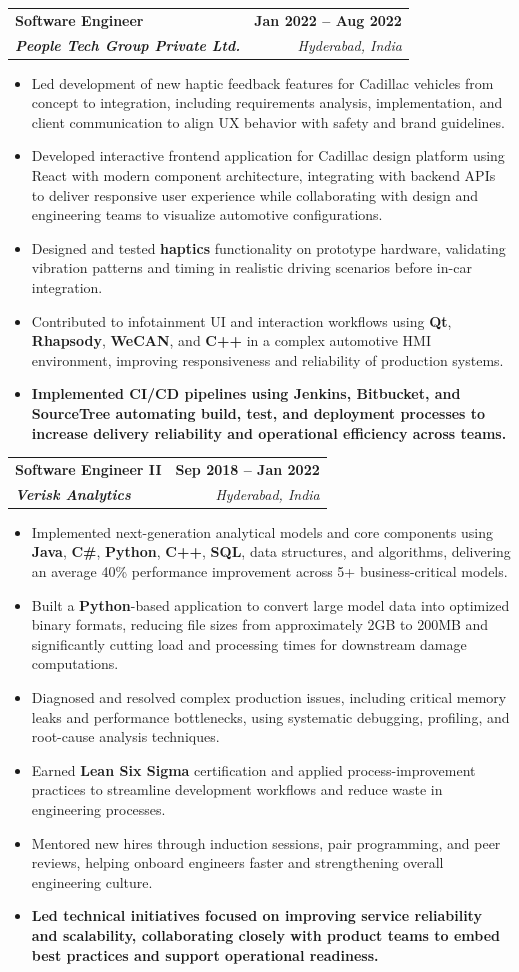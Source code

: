 \documentclass[letterpaper,11pt]{article}
\makeatletter
\newcommand{\resumeItem}[1]{
  \item\small{
    {#1 \vspace{-2pt}}
  }
}
\newcommand{\resumeSubheading}[4]{
  \vspace{-2pt}\item
    \begin{tabular*}{1.0\textwidth}[t]{l@{\extracolsep{\fill}}r}
      \textbf{#1} & \textbf{\small #2} \\
      \textit{\small#3} & \textit{\small #4} \\
    \end{tabular*}\vspace{-7pt}
}
\newcommand{\resumeItemListStart}{\begin{itemize}}
\newcommand{\resumeItemListEnd}{\end{itemize}\vspace{-5pt}}
\makeatother
\begin{document}
    \resumeSubheading
      {\textbf{Software Engineer}}{\textbf{Jan 2022 -- Aug 2022}}
      {\textbf{People Tech Group Private Ltd.}}{Hyderabad, India}
      \resumeItemListStart
        \resumeItem{Led development of new haptic feedback features for Cadillac vehicles from concept to integration, including requirements analysis, implementation, and client communication to align UX behavior with safety and brand guidelines.}
        \resumeItem{Developed interactive frontend application for Cadillac design platform using React with modern component architecture, integrating with backend APIs to deliver responsive user experience while collaborating with design and engineering teams to visualize automotive configurations.}
        \resumeItem{Designed and tested \textbf{haptics} functionality on prototype hardware, validating vibration patterns and timing in realistic driving scenarios before in-car integration.}
        \resumeItem{Contributed to infotainment UI and interaction workflows using \textbf{Qt}, \textbf{Rhapsody}, \textbf{WeCAN}, and \textbf{C++} in a complex automotive HMI environment, improving responsiveness and reliability of production systems.}
        \resumeItem{\textbf{Implemented CI/CD pipelines using Jenkins, Bitbucket, and SourceTree automating build, test, and deployment processes to increase delivery reliability and operational efficiency across teams.}}
      \resumeItemListEnd

    \resumeSubheading
      {\textbf{Software Engineer II}}{\textbf{Sep 2018 -- Jan 2022}}
      {\textbf{Verisk Analytics}}{Hyderabad, India}
      \resumeItemListStart
        \resumeItem{Implemented next-generation analytical models and core components using \textbf{Java}, \textbf{C\#}, \textbf{Python}, \textbf{C++}, \textbf{SQL}, data structures, and algorithms, delivering an average 40\% performance improvement across 5+ business-critical models.}
        \resumeItem{Built a \textbf{Python}-based application to convert large model data into optimized binary formats, reducing file sizes from approximately 2GB to 200MB and significantly cutting load and processing times for downstream damage computations.}
        \resumeItem{Diagnosed and resolved complex production issues, including critical memory leaks and performance bottlenecks, using systematic debugging, profiling, and root-cause analysis techniques.}
        \resumeItem{Earned \textbf{Lean Six Sigma} certification and applied process-improvement practices to streamline development workflows and reduce waste in engineering processes.}
        \resumeItem{Mentored new hires through induction sessions, pair programming, and peer reviews, helping onboard engineers faster and strengthening overall engineering culture.}
        \resumeItem{\textbf{Led technical initiatives focused on improving service reliability and scalability, collaborating closely with product teams to embed best practices and support operational readiness.}}
      \resumeItemListEnd
\end{document}
